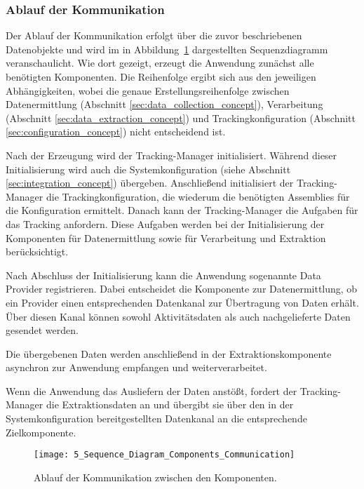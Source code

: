 \subsubsection{Ablauf der Kommunikation}
Der Ablauf der Kommunikation erfolgt über die zuvor beschriebenen Datenobjekte und wird im in Abbildung~\ref{fig:sequence_diagram_communication_components} dargestellten Sequenzdiagramm veranschaulicht.  
Wie dort gezeigt, erzeugt die Anwendung zunächst alle benötigten Komponenten. Die Reihenfolge ergibt sich aus den jeweiligen Abhängigkeiten, wobei die genaue Erstellungsreihenfolge zwischen Datenermittlung (Abschnitt \ref{sec:data_collection_concept}), Verarbeitung (Abschnitt \ref{sec:data_extraction_concept}) und Trackingkonfiguration (Abschnitt \ref{sec:configuration_concept}) nicht entscheidend ist.  

Nach der Erzeugung wird der Tracking-Manager initialisiert. Während dieser Initialisierung wird auch die Systemkonfiguration (siehe Abschnitt \ref{sec:integration_concept}) übergeben. Anschließend initialisiert der Tracking-Manager die Trackingkonfiguration, die wiederum die benötigten Assemblies für die Konfiguration ermittelt. Danach kann der Tracking-Manager die Aufgaben für das Tracking anfordern. Diese Aufgaben werden bei der Initialisierung der Komponenten für Datenermittlung sowie für Verarbeitung und Extraktion berücksichtigt.

Nach Abschluss der Initialisierung kann die Anwendung sogenannte Data Provider registrieren. Dabei entscheidet die Komponente zur Datenermittlung, ob ein Provider einen entsprechenden Datenkanal zur Übertragung von Daten erhält. Über diesen Kanal können sowohl Aktivitätsdaten als auch nachgelieferte Daten gesendet werden.

Die übergebenen Daten werden anschließend in der Extraktionskomponente asynchron zur Anwendung empfangen und weiterverarbeitet.  

Wenn die Anwendung das Ausliefern der Daten anstößt, fordert der Tracking-Manager die Extraktionsdaten an und übergibt sie über den in der Systemkonfiguration bereitgestellten Datenkanal an die entsprechende Zielkomponente.

\begin{figure}[H]
    \centering
    \texttt{[image: 5\_Sequence\_Diagram\_Components\_Communication]}
    \caption{Ablauf der Kommunikation zwischen den Komponenten.}
    \label{fig:sequence_diagram_communication_components}
\end{figure}


